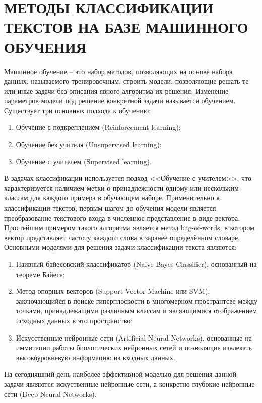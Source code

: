 \section{МЕТОДЫ КЛАССИФИКАЦИИ ТЕКСТОВ НА БАЗЕ МАШИННОГО ОБУЧЕНИЯ}
Машинное обучение -- это набор методов, позволяющих на основе набора данных, называемого тренировочным, строить модели, позволяющие решать те или иные задачи без описания явного алгоритма их решения. Изменение параметров модели под решение конкретной задачи называется обучением. Существует три основных подхода к обучению:
\begin{enumerate}
    \item Обучение с подкреплением (Reinforcement learning);
    \item Обучение без учителя (Unsupervised learning);
    \item Обучение с учителем (Supervised learning).
\end{enumerate}

В задачах классификации используется подход <<Обучение с учителем>>, что характеризуется наличием метки о принадлежности одному или нескольким классам для каждого примера в обучающем наборе. Применительно к классификации текстов, первым шагом до обучения модели является преобразование текстового входа в численное представление в виде вектора. Простейшим примером такого алгоритма является метод bag-of-words, в котором вектор представляет частоту каждого слова в заранее определённом словаре. Основными моделями для решения задачи классификации текста являются:
\begin{enumerate}
    \item Наивный байесовский классификатор (Naive Bayes Classifier), основанный на теореме Байеса;
    \item Метод опорных векторов (Support Vector Machine или SVM), заключающийся в поиске гиперплоскости в многомерном пространтсве между точками, принадлежащими различным классам и являющимися отображением исходных данных в это пространство;
    \item Искусственные нейронные сети (Artificial Neural Networks), основанные на иммитации работы биологических нейронных сетей и позволящие извлекать высокоуровневую информацию из входных данных.  
\end{enumerate}

На сегодняшний день наиболее эффективной моделью для решения данной задачи являются искуственные нейронные сети, а конкретно глубокие нейронные сети (Deep Neural Networks).
